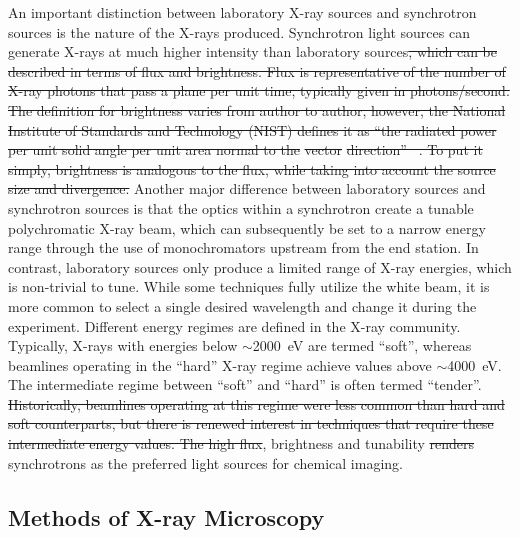 \documentclass[journal=cmatex,manuscript=perspective]{achemso}
\providecommand{\DIFaddtex}[1]{{\protect\color{blue}\uwave{#1}}} %
\providecommand{\DIFdeltex}[1]{{\protect\color{red}\sout{#1}}}                      %
\providecommand{\DIFaddbegin}{} %
\providecommand{\DIFaddend}{} %
\providecommand{\DIFdelbegin}{} %
\providecommand{\DIFdelend}{} %
\providecommand{\DIFadd}[1]{\texorpdfstring{\DIFaddtex{#1}}{#1}} %
\providecommand{\DIFdel}[1]{\texorpdfstring{\DIFdeltex{#1}}{}} %
\begin{document}
An important distinction between laboratory X-ray sources and
synchrotron sources is the nature of the X-rays produced. Synchrotron
light sources can generate X-rays at much higher intensity than
laboratory sources\DIFdelbegin \DIFdel{, which can be described in terms of flux and
brightness. Flux is representative of the number of X-ray photons that
pass a plane per unit time, typically given in photons/second. The
definition for brightness varies from author to author, however, the
National Institute of Standards and Technology (NIST) defines it as
``the radiated power per unit solid angle per unit area normal to the
}%
\DIFdel{vector}%
\DIFdel{direction''\mbox{%
\cite{sesame2004}}%
. To put it simply, brightness is
analogous to the flux, while taking into account the source size and
divergence. }\DIFdelend \DIFaddbegin \DIFadd{. }\DIFaddend Another major difference between laboratory
sources and synchrotron sources is that the optics within a
synchrotron create a tunable polychromatic X-ray beam, which can
subsequently be set to a narrow energy range through the use of
monochromators upstream from the end station. In contrast, laboratory
sources only produce a limited range of X-ray energies, which is
non-trivial to tune. While some techniques fully utilize the white
beam\cite{ice2009}, it is more common to select a single desired
wavelength and change it during the experiment. Different energy
regimes are defined in the X-ray community. Typically, X-rays with
energies below $\sim$\SI{2000}{eV} are termed ``soft'', whereas
beamlines operating in the ``hard'' X-ray regime achieve values above
$\sim$\SI{4000}{eV}. The intermediate regime between ``soft'' and
``hard'' is often termed ``tender''. \DIFdelbegin \DIFdel{Historically, beamlines operating at this regime were less
common than hard and soft counterparts, but there is renewed interest
in techniques that require these intermediate energy values. The high flux}\DIFdelend \DIFaddbegin \DIFadd{The high intensity}\DIFaddend , brightness
and tunability \DIFdelbegin \DIFdel{renders }\DIFdelend \DIFaddbegin \DIFadd{render }\DIFaddend synchrotrons as the preferred light sources for
chemical imaging.

\subsection{Methods of X-ray Microscopy}
\end{document}
